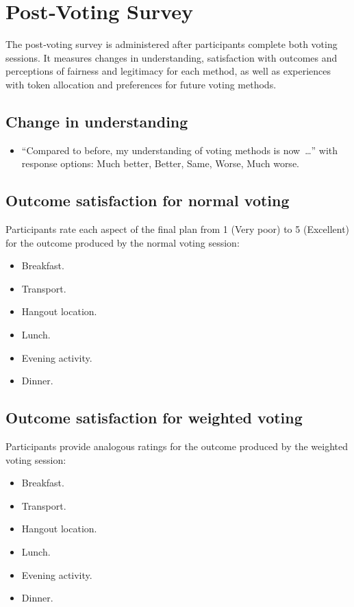 \section{Post‑Voting Survey}
\label{appendix:post-survey}

The post‑voting survey is administered after participants complete both
voting sessions.  It measures changes in understanding, satisfaction with
outcomes and perceptions of fairness and legitimacy for each method, as
well as experiences with token allocation and preferences for future
voting methods.

\subsection*{Change in understanding}
\begin{itemize}
    \item ``Compared to before, my understanding of voting methods is
    now …'' with response options: Much better, Better, Same, Worse,
    Much worse.
\end{itemize}

\subsection*{Outcome satisfaction for normal voting}
Participants rate each aspect of the final plan from 1 (Very poor) to
5 (Excellent) for the outcome produced by the normal voting session:
\begin{itemize}
    \item Breakfast.
    \item Transport.
    \item Hangout location.
    \item Lunch.
    \item Evening activity.
    \item Dinner.
\end{itemize}

\subsection*{Outcome satisfaction for weighted voting}
Participants provide analogous ratings for the outcome produced by the
weighted voting session:
\begin{itemize}
    \item Breakfast.
    \item Transport.
    \item Hangout location.
    \item Lunch.
    \item Evening activity.
    \item Dinner.
\end{itemize}


